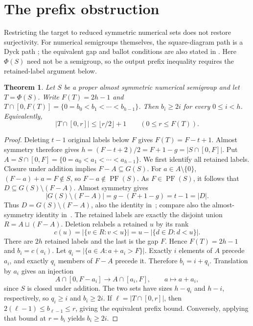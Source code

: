 \documentclass[11pt,a4paper]{article}
\newtheorem{theorem}{Theorem}
\theoremstyle{definition}
\theoremstyle{remark}
\newcommand{\PF}{\operatorname{PF}}
\begin{document}
\section{The prefix obstruction}
Restricting the target to reduced symmetric numerical sets does not restore
surjectivity. For numerical semigroups themselves, the square-diagram path
is a Dyck path \cite[Theorem~4.3 in the arXiv version]{BM}; the equivalent
gap and ballot conditions are also stated in
\cite[Theorem~7.2 and Remark~7.3]{RR}.
Here $\Phi(S)$ need not be a semigroup, so the output prefix inequality
requires the retained-label argument below.
\begin{theorem}\label{thm:bound}
Let $S$ be a proper almost symmetric numerical semigroup and let
$T=\Phi(S)$. Write $F(T)=2h-1$ and
$T\cap[0,F(T)]=\{0=b_0<b_1<\cdots<b_{h-1}\}$.
Then $b_i\geq2i$ for every $0\leq i<h$. Equivalently,
\[
 |T\cap[0,r]|\leq\lfloor r/2\rfloor+1
 \qquad(0\leq r\leq F(T)).
\]
\end{theorem}
\begin{proof}
Deleting $t-1$ original labels below $F$ gives $F(T)=F-t+1$.
Almost symmetry therefore gives
$h=(F-t+2)/2=F+1-g=|S\cap[0,F]|$.
Put $A=S\cap[0,F]=\{0=a_0<a_1<\cdots<a_{h-1}\}$.
We first identify all retained labels. Closure under addition implies
$F-A\subseteq G(S)$. For $a\in A\setminus\{0\}$,
$(F-a)+a=F\notin S$, so $F-a\notin\PF(S)$.
As $F\in\PF(S)$, it follows that
$D\subseteq G(S)\setminus(F-A)$. Almost symmetry gives
\[
 |G(S)\setminus(F-A)|=g-(F+1-g)=t-1=|D|.
\]
Thus $D=G(S)\setminus(F-A)$, also the identity
in~\cite[Proposition~3.2(3)]{DSY}; compare also the almost-symmetry
identity in~\cite[proof of Proposition~2.9]{CKLOS}. The retained labels are exactly
the disjoint union $R=A\sqcup(F-A)$.
Deletion relabels a retained $u$ by its rank
\[
 c(u)=|\{v\in R:v<u\}|=u-|\{d\in D:d<u\}|.
\]
There are $2h$ retained labels and the last is the gap $F$.
Hence $F(T)=2h-1$ and $b_i=c(a_i)$.
Let $q_i=|\{a\in A:a+a_i>F\}|$. Exactly $i$ elements of $A$
precede $a_i$, and exactly $q_i$ members of $F-A$ precede it. Therefore
$b_i=i+q_i$. Translation by $a_i$ gives an injection
\[
 A\cap[0,F-a_i]\longrightarrow A\cap[a_i,F],\qquad
 a\longmapsto a+a_i,
\]
since $S$ is closed under addition. The two sets have sizes $h-q_i$
and $h-i$, respectively, so $q_i\geq i$ and $b_i\geq2i$.
If $\ell=|T\cap[0,r]|$, then $2(\ell-1)\leq b_{\ell-1}\leq r$,
giving the equivalent prefix bound. Conversely, applying that bound
at $r=b_i$ yields $b_i\geq2i$.
\end{proof}
\end{document}
